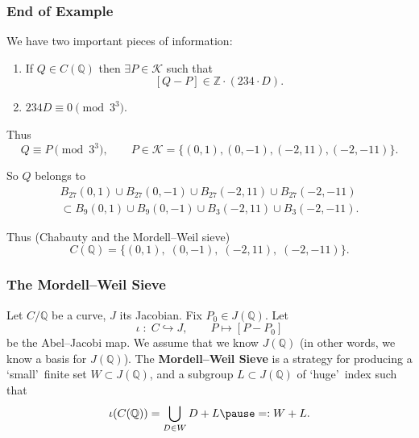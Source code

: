 \documentclass{beamer}
\newcommand{\Q}{{\mathbb Q}}
\newcommand{\Z}{{\mathbb Z}}
\newcommand{\cK}{\mathcal{K}}
\theoremstyle{definition}
\theoremstyle{remark}
\begin{document}
\begin{frame}
\frametitle{End of Example}
We have two important pieces of information:
\begin{enumerate}
\item If $Q \in C(\Q)$ then $\exists P
\in \cK$ such that
\[
[Q-P] \in\Z \cdot (234\cdot D) .
\]
\item $234 D \equiv 0 \pmod{3^3}$.
\end{enumerate}
Thus 
\[
Q \equiv P \pmod{3^3}, \qquad P \in \cK=
\{(0,1),(0,-1),(-2,11),(-2,-11)\}.
\]


So $Q$ belongs to
\begin{multline*}
B_{27}(0,1) \cup B_{27}(0,-1) \cup B_{27}(-2,11) \cup B_{27}(-2,-11)
\\
\subset
B_9(0,1) \cup B_9(0,-1) \cup B_3(-2,11) \cup B_3(-2,-11).
\end{multline*}

\pause

Thus (Chabauty and the Mordell--Weil sieve)
\[
C(\Q)=\{ (0,1), \; (0,-1), \; ( -2,11), \; (-2,-11) \}.
\]
\end{frame}


\begin{frame}
\frametitle{The Mordell--Weil Sieve}

Let $C/\Q$ be a curve, $J$ its Jacobian. Fix $P_0 \in J(\Q)$.  Let
\[
\iota \; : \; C \hookrightarrow J, \qquad P \mapsto [P-P_0]
\] 
be the Abel--Jacobi map. 
We assume that we know $J(\Q)$ (in other words,
we know a basis for $J(\Q)$). The {\bf Mordell--Weil Sieve}
is a strategy for producing a \lq small\rq\ finite set $W \subset
J(\Q)$, and a subgroup $L \subset J(\Q)$ of \lq huge\rq\ index
such that 
\[
\iota(C(\Q))=\bigcup_{D \in W} D+L
\pause
=:W+L.
\]
\end{frame}
\end{document}
